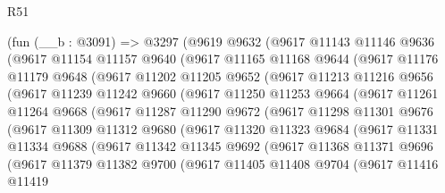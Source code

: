 \begin{lexlean}{R51}
\begin{coremodule}
    (fun (__b : @3091) =>
    @3297
      (@9619
        @9632
        (@9617
          @11143
          @11146
          @9636
          (@9617
            @11154
            @11157
            @9640
            (@9617
              @11165
              @11168
              @9644
              (@9617
                @11176
                @11179
                @9648
                (@9617
                  @11202
                  @11205
                  @9652
                  (@9617
                    @11213
                    @11216
                    @9656
                    (@9617
                      @11239
                      @11242
                      @9660
                      (@9617
                        @11250
                        @11253
                        @9664
                        (@9617
                          @11261
                          @11264
                          @9668
                          (@9617
                            @11287
                            @11290
                            @9672
                            (@9617
                              @11298
                              @11301
                              @9676
                              (@9617
                                @11309
                                @11312
                                @9680
                                (@9617
                                  @11320
                                  @11323
                                  @9684
                                  (@9617
                                    @11331
                                    @11334
                                    @9688
                                    (@9617
                                      @11342
                                      @11345
                                      @9692
                                      (@9617
                                        @11368
                                        @11371
                                        @9696
                                        (@9617
                                          @11379
                                          @11382
                                          @9700
                                          (@9617
                                            @11405
                                            @11408
                                            @9704
                                            (@9617
                                              @11416
                                              @11419

\end{coremodule}
\end{lexlean}
